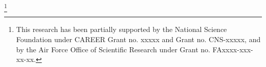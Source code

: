 


\thanks{This research has been partially supported by the National Science Foundation under CAREER Grant no. xxxxx and Grant no. CNS-xxxxx, and by the Air Force Office of Scientific Research under Grant no. FAxxxx-xxx-xx-xx.}